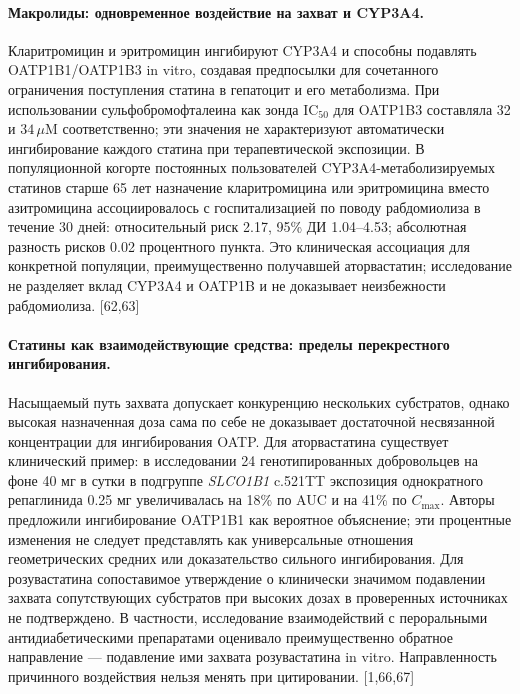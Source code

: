 \documentclass[11pt]{article}
\begin{document}
\paragraph{Макролиды: одновременное воздействие на захват и CYP3A4.}
Кларитромицин и эритромицин ингибируют CYP3A4 и способны подавлять OATP1B1/OATP1B3 in vitro, создавая предпосылки для сочетанного ограничения поступления статина в гепатоцит и его метаболизма. При использовании сульфобромофталеина как зонда \(\mathrm{IC}_{50}\) для OATP1B3 составляла 32 и \(34\,\mu\mathrm{M}\) соответственно; эти значения не характеризуют автоматически ингибирование каждого статина при терапевтической экспозиции. В популяционной когорте постоянных пользователей CYP3A4-метаболизируемых статинов старше 65 лет назначение кларитромицина или эритромицина вместо азитромицина ассоциировалось с госпитализацией по поводу рабдомиолиза в течение 30 дней: относительный риск 2.17, 95\% ДИ 1.04--4.53; абсолютная разность рисков 0.02 процентного пункта. Это клиническая ассоциация для конкретной популяции, преимущественно получавшей аторвастатин; исследование не разделяет вклад CYP3A4 и OATP1B и не доказывает неизбежности рабдомиолиза. [62,63]

\paragraph{Статины как взаимодействующие средства: пределы перекрестного ингибирования.}
Насыщаемый путь захвата допускает конкуренцию нескольких субстратов, однако высокая назначенная доза сама по себе не доказывает достаточной несвязанной концентрации для ингибирования OATP. Для аторвастатина существует клинический пример: в исследовании 24 генотипированных добровольцев на фоне 40 мг в сутки в подгруппе \textit{SLCO1B1} c.521TT экспозиция однократного репаглинида 0.25 мг увеличивалась на 18\% по AUC и на 41\% по \(C_{\max}\). Авторы предложили ингибирование OATP1B1 как вероятное объяснение; эти процентные изменения не следует представлять как универсальные отношения геометрических средних или доказательство сильного ингибирования. Для розувастатина сопоставимое утверждение о клинически значимом подавлении захвата сопутствующих субстратов при высоких дозах в проверенных источниках не подтверждено. В частности, исследование взаимодействий с пероральными антидиабетическими препаратами оценивало преимущественно обратное направление --- подавление ими захвата розувастатина in vitro. Направленность причинного воздействия нельзя менять при цитировании. [1,66,67]
\end{document}
